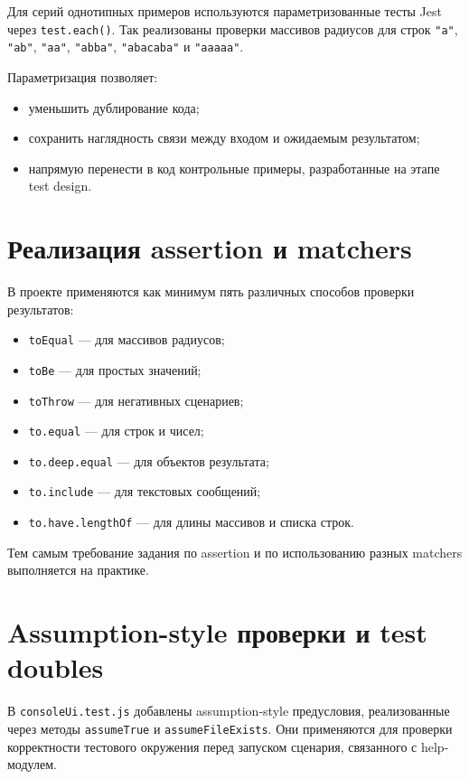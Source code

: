 Для серий однотипных примеров используются параметризованные тесты Jest через \texttt{test.each()}.
Так реализованы проверки массивов радиусов для строк \texttt{"a"}, \texttt{"ab"}, \texttt{"aa"}, \texttt{"abba"}, \texttt{"abacaba"} и \texttt{"aaaaa"}.

Параметризация позволяет:
\begin{itemize}
    \item уменьшить дублирование кода;
    \item сохранить наглядность связи между входом и ожидаемым результатом;
    \item напрямую перенести в код контрольные примеры, разработанные на этапе test design.
\end{itemize}

\section{Реализация assertion и matchers} \label{ch4:sec3}

В проекте применяются как минимум пять различных способов проверки результатов:
\begin{itemize}
    \item \texttt{toEqual} --- для массивов радиусов;
    \item \texttt{toBe} --- для простых значений;
    \item \texttt{toThrow} --- для негативных сценариев;
    \item \texttt{to.equal} --- для строк и чисел;
    \item \texttt{to.deep.equal} --- для объектов результата;
    \item \texttt{to.include} --- для текстовых сообщений;
    \item \texttt{to.have.lengthOf} --- для длины массивов и списка строк.
\end{itemize}

Тем самым требование задания по assertion и по использованию разных matchers выполняется на практике.

\section{Assumption-style проверки и test doubles} \label{ch4:sec4}

В \texttt{consoleUi.test.js} добавлены assumption-style предусловия, реализованные через методы \texttt{assumeTrue} и \texttt{assumeFileExists}.
Они применяются для проверки корректности тестового окружения перед запуском сценария, связанного с help-модулем.

